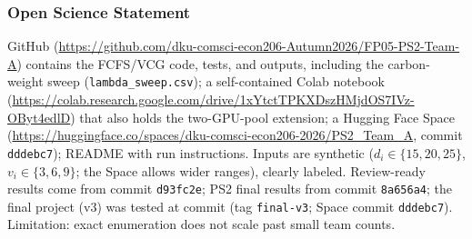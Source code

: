 \subsubsection*{Open Science Statement}
GitHub (\url{https://github.com/dku-comsci-econ206-Autumn2026/FP05-PS2-Team-A}) contains the FCFS/VCG code, tests, and outputs, including the carbon-weight sweep (\texttt{lambda\_sweep.csv}); a self-contained Colab notebook (\url{https://colab.research.google.com/drive/1xYtctTPKXDszHMjdOS7IVz-OByt4edlD}) that also holds the two-GPU-pool extension; a Hugging Face Space (\url{https://huggingface.co/spaces/dku-comsci-econ206-2026/PS2_Team_A}, commit \texttt{dddebc7}); README with run instructions. Inputs are synthetic ($d_i\in\{15,20,25\}$, $v_i\in\{3,6,9\}$; the Space allows wider ranges), clearly labeled. Review-ready results come from commit \texttt{d93fc2e}; PS2 final results from commit \texttt{8a656a4}; the final project (v3) was tested at commit \texttt{\TestedCommit} (tag \texttt{final-v3}; Space commit \texttt{dddebc7}). Limitation: exact enumeration does not scale past small team counts.
